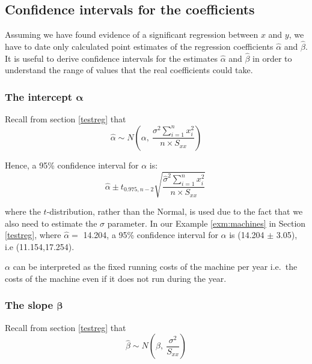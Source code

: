 \documentclass[12pt,a4paper,openany,twoside]{report}
\theoremstyle{definition}
\theoremstyle{remark}
\theoremstyle{plain}
\theoremstyle{definition}
\theoremstyle{definition}
\theoremstyle{definition}
\theoremstyle{remark}
\begin{document}
\hypertarget{coefci}{%
\subsection{Confidence intervals for the coefficients}\label{coefci}}

Assuming we have found evidence of a significant regression between
\(x\) and \(y\), we have to date only calculated point estimates of the
regression coefficients \(\hat{\alpha}\) and \(\hat{\beta}.\) It is
useful to derive confidence intervals for the estimates \(\hat{\alpha}\)
and \(\hat{\beta}\) in order to understand the range of values that the
real coefficients could take.

\hypertarget{the-intercept-mathbfalpha}{%
\subsubsection*{\texorpdfstring{The intercept \(\mathbf{\alpha}\)}{The intercept \textbackslash{}mathbf\{\textbackslash{}alpha\}}}\label{the-intercept-mathbfalpha}}

Recall from section \ref{testreg} that
\[\hat{\alpha}\sim N\left(\alpha,\ \frac{\sigma^{2}\sum_{i=1}^{n}x_{i}^{2}}{n\times S_{xx}}\right)\]

Hence, a 95\% confidence interval for \(\alpha\) is:
\[\hat{\alpha} \pm t_{0.975, n - 2}\sqrt{\frac{{\hat{\sigma}}^{2}\sum_{i=1}^{n}x_{i}^{2}}{n\times S_{xx}}}\ \]

where the \(t\)-distribution, rather than the Normal, is used due to the fact that we also need to estimate the \(\sigma\) parameter.
In our Example \ref{exm:machines} in Section \ref{testreg}, where \(\hat{\alpha} =\) 14.204, a 95\%
confidence interval for \(\alpha\) is (14.204 \(\pm\) 3.05), i.e
(11.154,17.254).

\(\alpha\) can be interpreted as the fixed running costs of the machine
per year i.e.~the costs of the machine even if it does not run during
the year.

\hypertarget{the-slope-mathbfbeta}{%
\subsubsection*{\texorpdfstring{The slope \(\mathbf{\beta}\)}{The slope \textbackslash{}mathbf\{\textbackslash{}beta\}}}\label{the-slope-mathbfbeta}}

Recall from section \ref{testreg} that
\[\hat{\beta}\sim N\left(\beta,\ \frac{\sigma^{2}}{S_{xx}}\right)\]
\end{document}
